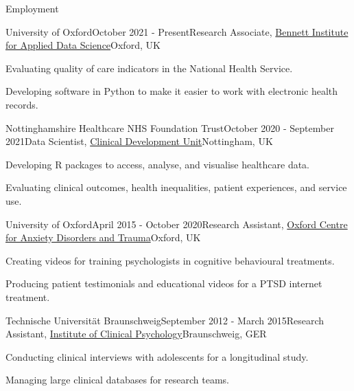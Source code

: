 \documentclass{resume} %
\begin{document}

\begin{rSection}{Employment}

\begin{rSubsection}{University of Oxford}{October 2021 - Present}{Research Associate, \href{https://www.bennett.ox.ac.uk/}{Bennett Institute for Applied Data Science}}{Oxford, UK}
  \item Evaluating quality of care indicators in the National Health Service.
  \item Developing software in Python to make it easier to work with electronic health records.
\end{rSubsection}

\begin{rSubsection}{Nottinghamshire Healthcare NHS Foundation Trust}{October 2020 - September 2021}{Data Scientist, \href{https://www.nottinghamshirehealthcare.nhs.uk/}{Clinical Development Unit}}{Nottingham, UK}
  \item Developing R packages to access, analyse, and visualise healthcare data.
  \item Evaluating clinical outcomes, health inequalities, patient experiences, and service use.
\end{rSubsection}

\begin{rSubsection}{University of Oxford}{April 2015 - October 2020}{Research Assistant, \href{https://www.psy.ox.ac.uk/research/oxford-centre-for-anxiety-disorders-and-trauma}{Oxford Centre for Anxiety Disorders and Trauma}}{Oxford, UK}
  \item Creating videos for training psychologists in cognitive behavioural treatments.
  \item Producing patient testimonials and educational videos for a PTSD internet treatment.
\end{rSubsection}

\begin{rSubsection}{Technische Universit{\"a}t Braunschweig}{September 2012 - March 2015}{Research Assistant, \href{https://www.tu-braunschweig.de/psychologie/klinische}{Institute of Clinical Psychology}}{Braunschweig, GER}
  \item Conducting clinical interviews with adolescents for a longitudinal study.
  \item Managing large clinical databases for research teams.
\end{rSubsection}

\end{rSection}
\end{document}
